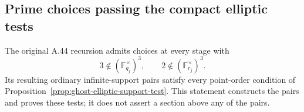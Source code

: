 \subsection{Prime choices passing the compact elliptic tests}
\label{sec:ghost-elliptic-survival}

\begin{proposition}
\label{prop:ghost-elliptic-passing}
The original A.44 recursion admits choices at every stage with
\[
 3\notin(\mathbb F_{q_j}^{\times})^3,
       \qquad 2\notin(\mathbb F_{r_j}^{\times})^3.
                                                        \tag{21}
\]
Its resulting ordinary infinite-support pairs satisfy every
point-order condition of
Proposition~\ref{prop:ghost-elliptic-support-test}.
This statement constructs the pairs and proves these tests;
it does not assert a section above any of the pairs.
\end{proposition}
